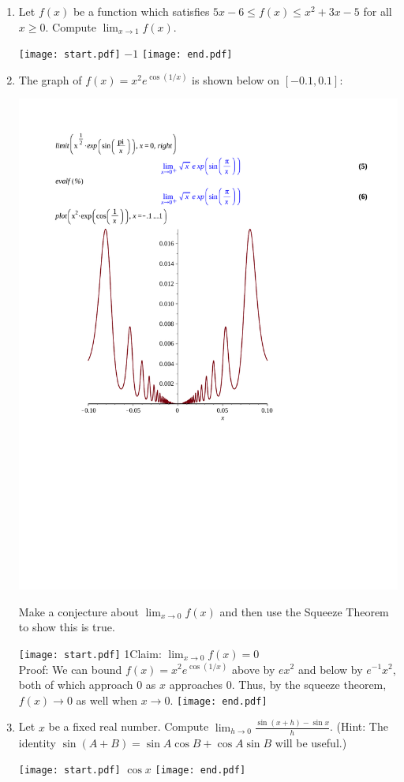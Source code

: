 \documentclass[12pt]{article}
\begin{document}
\begin{enumerate}
\item Let $f(x)$ be a function which satisfies $\displaystyle 5x-6 \leq f(x) \leq x^2+3x-5$ for all $x \geq 0$.  Compute $\displaystyle \lim_{x \rightarrow 1}{f(x)}$.

\texttt{[image: start.pdf]}
{{$-1$}}
\texttt{[image: end.pdf]}


\item The graph of $\displaystyle f(x)=x^2e^{\cos{(1/x)}}$ is shown below on $[-0.1,0.1]$:\\

\begin{center}
\includegraphics[scale=.6]{squeezegraph.pdf}
\end{center}

Make a conjecture about $\displaystyle \lim_{x \rightarrow 0}{f(x)}$ and then use the Squeeze Theorem to show this is true.

\texttt{[image: start.pdf]}
{{{1\linewidth}{Claim: $\displaystyle \lim_{x\rightarrow 0}{f(x)}=0$\\
Proof: We can bound $\displaystyle f(x)=x^2e^{\cos{(1/x)}}$ above by $ex^2$ and below by $e^{-1}x^2$, both of which approach 0 as $x$ approaches 0.  Thus, by the squeeze theorem, $f(x) \rightarrow 0$ as well when $x \rightarrow 0$.}}}
\texttt{[image: end.pdf]}


\item Let $x$ be a fixed real number.  Compute $\lim_{h \rightarrow 0}\frac{\sin{(x+h)}-\sin{x}}{h}$.  (Hint: The identity $\sin{(A+B)}=\sin{A}\cos{B}+\cos{A}\sin{B}$ will be useful.)

\texttt{[image: start.pdf]}
{{$\cos{x}$}}
\texttt{[image: end.pdf]}


\end{enumerate}
\end{document}
